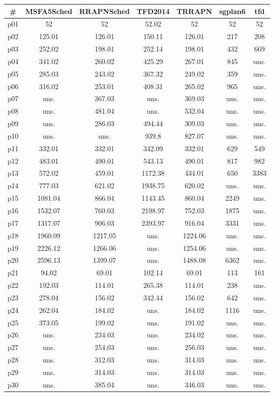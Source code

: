 \begin{tabular}{ccccccc}
\toprule
\textbf{\#} & \textbf{MSFA5Sched} & \textbf{RRAPNSched} & \textbf{TFD2014} & \textbf{TRRAPN} & \textbf{sgplan6} & \textbf{tfd}\\
\midrule
p01 & 52 & 52 & 52.02 & 52 & 52 & 52\\
p02 & 125.01 & 126.01 & 150.11 & 126.01 & 217 & 208\\
p03 & 252.02 & 198.01 & 252.14 & 198.01 & 432 & 669\\
p04 & 341.02 & 260.02 & 425.29 & 267.01 & 845 & uns.\\
p05 & 285.03 & 243.02 & 367.32 & 249.02 & 359 & uns.\\
p06 & 316.02 & 253.01 & 408.31 & 265.02 & 965 & uns.\\
p07 & uns. & 367.03 & uns. & 369.03 & uns. & uns.\\
p08 & uns. & 481.04 & uns. & 532.04 & uns. & uns.\\
p09 & uns. & 286.03 & 494.44 & 309.03 & uns. & uns.\\
p10 & uns. & uns. & 939.8 & 827.07 & uns. & uns.\\
p11 & 332.01 & 332.01 & 342.09 & 332.01 & 629 & 549\\
p12 & 483.01 & 490.01 & 543.13 & 490.01 & 817 & 982\\
p13 & 572.02 & 459.01 & 1172.38 & 434.01 & 650 & 3383\\
p14 & 777.03 & 621.02 & 1938.75 & 620.02 & uns. & uns.\\
p15 & 1081.04 & 866.04 & 1143.45 & 860.04 & 2249 & uns.\\
p16 & 1532.07 & 760.03 & 2198.97 & 752.03 & 1875 & uns.\\
p17 & 1317.07 & 906.03 & 2393.97 & 916.04 & 3331 & uns.\\
p18 & 1960.09 & 1217.05 & uns. & 1224.06 & uns. & uns.\\
p19 & 2226.12 & 1266.06 & uns. & 1254.06 & uns. & uns.\\
p20 & 2596.13 & 1399.07 & uns. & 1488.08 & 6362 & uns.\\
p21 & 94.02 & 69.01 & 102.14 & 69.01 & 113 & 161\\
p22 & 192.03 & 114.01 & 265.38 & 114.01 & 238 & uns.\\
p23 & 278.04 & 156.02 & 342.44 & 156.02 & 642 & uns.\\
p24 & 262.04 & 184.02 & uns. & 184.02 & 1116 & uns.\\
p25 & 373.05 & 199.02 & uns. & 191.02 & uns. & uns.\\
p26 & uns. & 234.03 & uns. & 234.02 & uns. & uns.\\
p27 & uns. & 254.03 & uns. & 256.03 & uns. & uns.\\
p28 & uns. & 312.03 & uns. & 314.03 & uns. & uns.\\
p29 & uns. & 314.03 & uns. & 314.03 & uns. & uns.\\
p30 & uns. & 385.04 & uns. & 346.03 & uns. & uns.\\
\bottomrule
\end{tabular}

